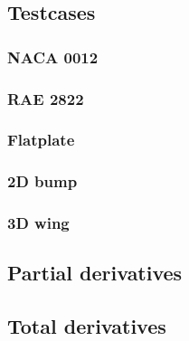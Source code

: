 \subsection{Testcases}

\subsubsection{NACA 0012}
\subsubsection{RAE 2822}
\subsubsection{Flatplate}
\subsubsection{2D bump}
\subsubsection{3D wing}


\subsection{Partial derivatives}

\subsection{Total derivatives}


